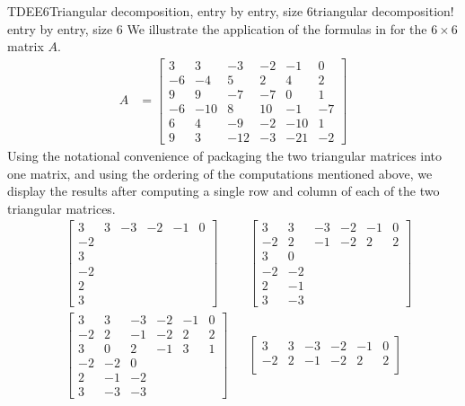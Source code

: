 \begin{example}{TDEE6}{Triangular decomposition, entry by entry, size 6}{triangular decomposition! entry by entry, size 6}
%
We illustrate the application of the formulas in  for the $6\times 6$ matrix $A$.
%
\begin{align*}
A&=
\begin{bmatrix}
 3 & 3 & -3 & -2 & -1 & 0 \\
 -6 & -4 & 5 & 2 & 4 & 2 \\
 9 & 9 & -7 & -7 & 0 & 1 \\
 -6 & -10 & 8 & 10 & -1 & -7 \\
 6 & 4 & -9 & -2 & -10 & 1 \\
 9 & 3 & -12 & -3 & -21 & -2
\end{bmatrix}
\end{align*}
%
Using the notational convenience of packaging the two triangular matrices into one matrix, and using the ordering of the computations mentioned above, we display the results after computing a single row and column of each of the two triangular matrices.
%
\begin{align*}
%
&
\begin{bmatrix}
3&3&-3&-2&-1&0\\
 -2  \\
 3  \\
 -2  \\
 2  \\
 3
\end{bmatrix}
%
&&
\begin{bmatrix}
 3 & 3 & -3 & -2 & -1 & 0 \\
 -2 & 2 & -1 & -2 & 2 & 2 \\
 3 & 0  \\
 -2 & -2  \\
 2 & -1  \\
 3 & -3
\end{bmatrix}\\
&
\begin{bmatrix}
 3 & 3 & -3 & -2 & -1 & 0 \\
 -2 & 2 & -1 & -2 & 2 & 2 \\
 3 & 0 & 2 & -1 & 3 & 1 \\
 -2 & -2 & 0  \\
 2 & -1 & -2  \\
 3 & -3 & -3
\end{bmatrix}
%
&&
\begin{bmatrix}
 3 & 3 & -3 & -2 & -1 & 0 \\
 -2 & 2 & -1 & -2 & 2 & 2 \\

\end{bmatrix}
\end{align*}
\end{example}
